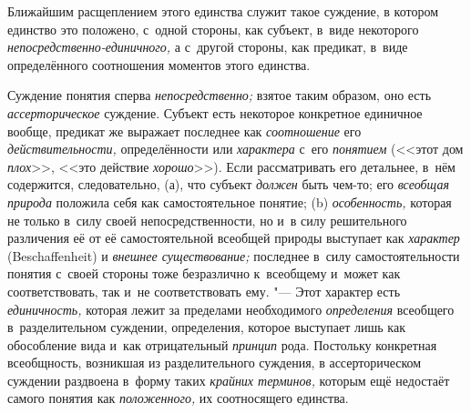 Ближайшим расщеплением этого единства служит такое суждение, в
котором единство это положено, с~одной стороны, как субъект, в~виде
некоторого
{\em непосредственно-единичного,}
а с~другой стороны, как предикат, в~виде определённого
соотношения моментов этого единства.


Суждение понятия сперва
{\em непосредственно;}
взятое таким образом, оно есть
{\em ассерторическое}
суждение. Субъект есть некоторое конкретное единичное вообще,
предикат же выражает последнее как
{\em соотношение} его
{\em действительности,}
определённости или
{\em характера} с~его
{\em понятием} (<<этот дом
{\em плох}>>, <<это
действие {\em хорошо}>>).
Если рассматривать его детальнее, в~нём содержится,
следовательно, (а), что субъект
{\em должен} быть чем-то;
его {\em всеобщая природа}
положила себя как самостоятельное понятие; (b)
{\em особенность,}
которая не только в~силу своей непосредственности, но и~в
силу решительного различения её от её самостоятельной всеобщей природы
выступает как {\em характер}
(Beschaf\-fenheit) и
{\em внешнее существование;}
последнее в~силу самостоятельности понятия с~своей стороны
тоже безразлично к~всеобщему и~может как соответствовать, так и~не
соответствовать ему. "--- Этот характер есть
{\em единичность,}
которая лежит за пределами необходимого
{\em определения}
всеобщего в~разделительном суждении, определения, которое
выступает лишь как обособление вида и~как отрицательный
{\em принцип} рода.
Постольку конкретная всеобщность, возникшая из разделительного суждения, в
ассерторическом суждении раздвоена в~форму таких
{\em крайних терминов,}
которым ещё недостаёт самого понятия как
{\em положенного,} их
соотносящего
единства.

